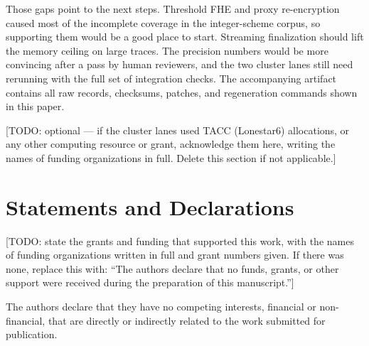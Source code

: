 \documentclass[pdflatex,sn-basic,Numbered,iicol]{sn-jnl}
\newcommand{\todo}[1]{\textcolor{red!75!black}{[TODO: #1]}}
\begin{document}
Those gaps point to the next steps. Threshold FHE and proxy re-encryption
caused most of the incomplete coverage in the integer-scheme corpus, so
supporting them would be a good place to start. Streaming finalization should
lift the memory ceiling on large traces. The precision numbers would be more
convincing after a pass by human reviewers, and the two cluster lanes still
need rerunning with the full set of integration checks. The accompanying
artifact contains all raw records, checksums, patches, and regeneration
commands shown in this paper.

\backmatter


\todo{optional --- if the cluster lanes used TACC (Lonestar6) allocations, or
any other computing resource or grant, acknowledge them here, writing the
names of funding organizations in full. Delete this section if not
applicable.}

\section*{Statements and Declarations}


\todo{state the grants and funding that supported this work, with the names of
funding organizations written in full and grant numbers given. If there was
none, replace this with: ``The authors declare that no funds, grants, or other
support were received during the preparation of this manuscript.''}


The authors declare that they have no competing interests, financial or
non-financial, that are directly or indirectly related to the work submitted
for publication.

\end{document}
